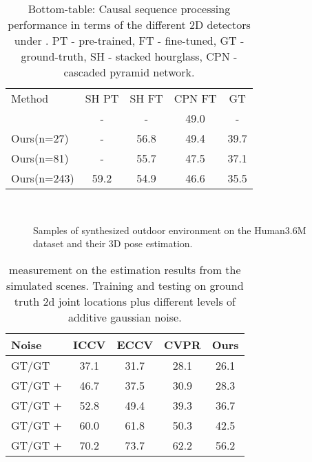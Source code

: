 \documentclass[twocolumn]{svjour3}          \smartqed  \usepackage{graphicx}
\begin{document}
\begin{table}[h]
	\begin{center}
			\begin{tabular}{l|c|c|c|c}
				\toprule
				Method & SH PT  & SH FT & CPN FT & GT \\
				\citep{Pavllo2019} & - & - & 49.0 & -\\
				Ours(n=27) & - & 56.8 & 49.4 & 39.7\\
				Ours(n=81) & - & 55.7 & 47.5 & 37.1\\
				Ours(n=243) & 59.2 & 54.9 & 46.6 & 35.5\\
				\bottomrule
			\end{tabular}
	\end{center}
	\caption{Bottom-table: Causal sequence processing performance in terms of the different 2D detectors  under . PT - pre-trained, FT - fine-tuned, GT - ground-truth, SH - stacked hourglass, CPN - cascaded pyramid network.}
	\label{tb:causal}
\end{table}

\begin{figure}[h!]
\\
\caption{Samples of synthesized outdoor environment on the Human3.6M dataset and their 3D pose estimation.}\label{fig:noisyEffects}
\end{figure}

\begin{table*}[h!]
	\begin{center}
			\begin{tabular}{l|c c c c}
				\toprule
				 Noise & ICCV\citep{Martinez2017} & ECCV\citep{Hossain2018} & CVPR\citep{Pavllo2019} & Ours\\
				\midrule
				GT/GT & 37.1 & 31.7 & 28.1 & 26.1\\
				GT/GT +   & 46.7 & 37.5 & 30.9 & 28.3\\
				GT/GT +  & 52.8 & 49.4 & 39.3 & 36.7\\
				GT/GT +  & 60.0 & 61.8 & 50.3 & 42.5\\
				GT/GT +  & 70.2 & 73.7 & 62.2 & 56.2\\
				\bottomrule
			\end{tabular}
	\end{center}
	\caption{ measurement on the estimation results from the simulated scenes. Training and testing on ground truth 2d joint locations plus different levels of additive gaussian noise.}
	\label{tb:noiseTable}
\end{table*}
\end{document}
